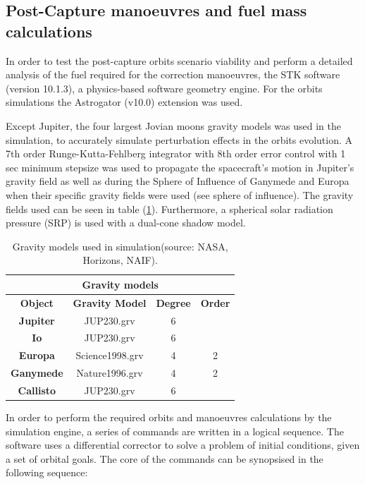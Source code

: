 \subsection{Post-Capture manoeuvres and fuel mass calculations}
In order to test the post-capture orbits scenario viability and perform a detailed analysis of the fuel required for the correction manoeuvres, the STK software (version 10.1.3), a physics-based software geometry engine. For the orbits simulations the Astrogator (v10.0) extension was used. 

Except Jupiter, the four largest Jovian moons gravity models was used in the simulation, to accurately simulate perturbation effects in the orbits evolution. A 7th order Runge-Kutta-Fehlberg integrator with 8th order error control with 1 sec minimum stepsize was used to propagate the spacecraft's motion in Jupiter's gravity field as well as during the Sphere of Influence of Ganymede and Europa when their specific gravity fields were used (see sphere of influence). The gravity fields used can be seen in table (\ref{tab:gravf}). Furthermore, a spherical solar radiation pressure (SRP) is used with a dual-cone shadow model.

\begin{table}[htb]
  \centering
    \begin{tabular}{|c|c|c|c|}
    \hline
    \multicolumn{4}{|c|}{\textbf{Gravity models}} \bigstrut\\
    \hline
    \textbf{Object} & \textbf{Gravity Model} & \textbf{Degree} & \textbf{Order} \bigstrut\\
    \hline
    \textbf{Jupiter} & JUP230.grv & 6     &  \bigstrut\\
    \hline
    \textbf{Io} & JUP230.grv & 6     &  \bigstrut\\
    \hline
    \textbf{Europa} & Science1998.grv & 4     & 2 \bigstrut\\
    \hline
    \textbf{Ganymede} & Nature1996.grv & 4     & 2 \bigstrut\\
    \hline
    \textbf{Callisto} & JUP230.grv & 6     &  \bigstrut\\
    \hline
    \end{tabular}%
    \caption{Gravity models used in simulation(source: NASA, Horizons, NAIF).\cite{Gravm}}\label{tab:gravf}
\end{table}%

In order to perform the required orbits and manoeuvres calculations by the simulation engine, a series of commands are written in a logical sequence. The software uses a differential corrector to solve a problem of initial conditions, given a set of orbital goals. 
The core of the commands can be synopsised in the following sequence:

